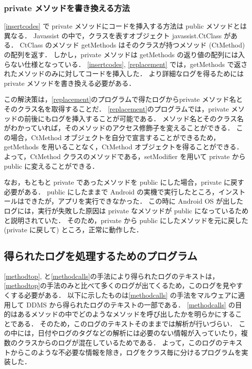 \subsubsection{private メソッドを書き換える方法}
\label{private}
\ref{insertcodes} で 
private メソッドにコードを挿入する方法は public メソッドとは異なる．
Javassist の中で，クラスを表すオブジェクト javassist.CtClass がある．
CtClass のメソッド getMethods はそのクラスが持つメソッド (CtMethod) の配列を返す．
しかし，private メソッドは getMethods の返り値の配列には入らない仕様となっている．
\ref{insertcodes}, \ref{replacement} では，getMethods で返されたメソッドのみに対してコードを挿入した．
より詳細なログを得るためには private メソッドを書き換える必要がある．

この解決策は，\ref{replacement}のプログラムで得たログからprivate メソッド名とそのクラス名を取得することだ．
\ref{replacement}のプログラムでは，private メソッドの前後にもログを挿入することが可能である．
メソッド名とそのクラス名がわかっていれば，そのメソッドのアクセス修飾子を変えることができる．
この場合，CtMethod オブジェクトを自分で宣言することができるため，getMethods を用いることなく，CtMethod オブジェクトを得ることができる． 
よって，CtMethod クラスのメソッドである，setModifier を用いて private から public に変えることができる．

なお，もともと private であったメソッドを public にした場合，private に戻す必要がある．
public にしたままで Android の実機で実行したところ，インストールはできたが，アプリを実行できなかった．
この時に Android OS が出したログには，実行が失敗した原因は private なメソッドが public になっているためと説明されていた．
そのため，private から public にしたメソッドを元に戻した(private に戻して) ところ，正常に動作した．

\subsection{得られたログを処理するためのプログラム}
\label{splitscript}
\ref{methodtop}, と\ref{methodcalls}の手法により得られたログのテキストは，\ref{methodtop}の手法のみと比べて多くのログが出てくるため，このログを見やすくする必要がある．
以下に示したものは\ref{methodcalls} の手法をマルウェアに適用して DDMS から得られたログのテキストの一部である．
\ref{methodcalls} の目的はあるメソッドの中でどのようなメソッドを呼び出したかを明らかにすることである．
そのため，このログのテキストそのままでは解析が行いづらい．
この中には，日付やログのタグなどの解析には必要のない情報が入っていたり，複数のクラスからのログが混在しているためである．
よって，このログのテキストからこのような不必要な情報を除き，ログをクラス毎に分けるプログラムを実装した．

